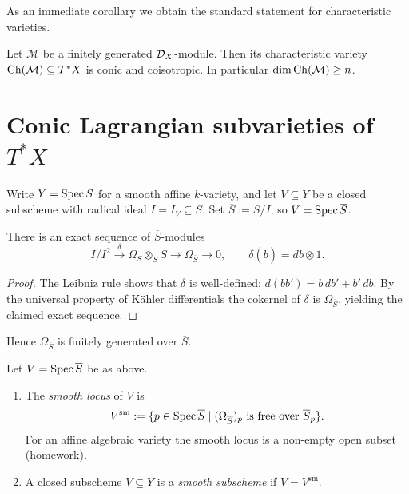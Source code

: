 As an immediate corollary we obtain the standard statement for characteristic
varieties.

\begin{theorem}[Thm.~8.6]
    Let $\mathcal M$ be a finitely generated $\mathcal{D}_X$-module.  Then its
    characteristic variety $\operatorname{Ch}(\mathcal M)\subseteq T^\ast X$ is conic and
    coisotropic.  In particular $\dim \operatorname{Ch}(\mathcal M)\ge n$.
\end{theorem}

\section{Conic Lagrangian subvarieties of $T^\ast X$}

Write $Y=\operatorname{Spec} S$ for a smooth affine $k$-variety, and let
$V\subseteq Y$ be a closed subscheme with radical ideal $I=I_V\subseteq S$.
Set $\overline S:=S/I$, so $V=\operatorname{Spec} \overline S$.

\begin{lemma}[Lemma~9.1]\label{lem:kahler-sequence}
    There is an exact sequence of $\overline S$-modules
    \[
        I/I^2 \xrightarrow{\;\delta\;} \Omega_S\otimes_S \overline S
        \longrightarrow \Omega_{\overline S}\longrightarrow 0,\qquad
        \delta(\overline b)=db\otimes 1.
    \]
\end{lemma}
\begin{proof}
    The Leibniz rule shows that $\delta$ is well-defined: $d(bb')=b\,db'+b'\,db$.
    By the universal property of Kähler differentials the cokernel of $\delta$ is
    $\Omega_{\overline S}$, yielding the claimed exact sequence.
\end{proof}

Hence $\Omega_{\overline S}$ is finitely generated over $\overline S$.

\begin{definition}[Def.~9.2]
    Let $V=\operatorname{Spec} \overline S$ be as above.
    \begin{enumerate}
        \item The \emph{smooth locus} of $V$ is
              \[
                  V^{\mathrm{sm}}
                  :=\{p\in \operatorname{Spec} \overline S\mid
                  (\Omega_{\overline S})_p
                  \text{ is free over }\overline S_p\}.
              \]
              For an affine algebraic variety the smooth locus is a non-empty open
              subset (homework).
        \item A closed subscheme $V\subseteq Y$ is a \emph{smooth subscheme} if
              $V=V^{\mathrm{sm}}$.
    \end{enumerate}
\end{definition}

